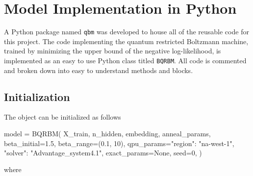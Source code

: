 \section{Model Implementation in Python}
A Python package named \texttt{qbm} was developed to house all of the reusable code for this project.
The code implementing the quantum restricted Boltzmann machine, trained by minimizing the upper bound of the negative log-likelihood, is implemented as an easy to use Python class titled \texttt{BQRBM}.
All code is commented and broken down into easy to understand methods and blocks.

\subsection{Initialization}
The object can be initialized as follows
\begin{python}
model = BQRBM(
    X_train,
    n_hidden,
    embedding,
    anneal_params,
    beta_initial=1.5,
    beta_range=(0.1, 10),
    qpu_params={"region": "na-west-1", "solver": "Advantage_system4.1"},
    exact_params=None,
    seed=0,
)
\end{python}
where
